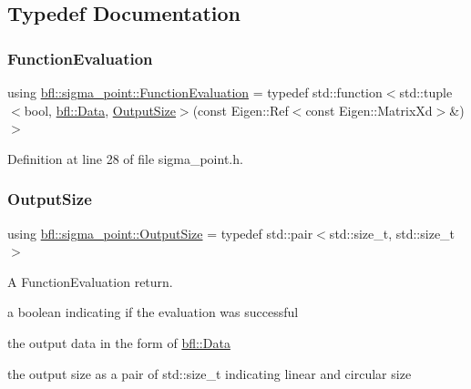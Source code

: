 \subsection{Typedef Documentation}
\mbox{\label{namespacebfl_1_1sigma__point_a6b412638c2556e4c1f84ba10965f785e}} 
\subsubsection{\texorpdfstring{Function\+Evaluation}{FunctionEvaluation}}
{\footnotesize\ttfamily using \mbox{\hyperlink{namespacebfl_1_1sigma__point_a6b412638c2556e4c1f84ba10965f785e}{bfl\+::sigma\+\_\+point\+::\+Function\+Evaluation}} = typedef std\+::function$<$std\+::tuple$<$bool, \mbox{\hyperlink{namespacebfl_af6b103c6821db1b54452f776fdd9dd02}{bfl\+::\+Data}}, \mbox{\hyperlink{namespacebfl_1_1sigma__point_aa482c1c98a2280cd8f7635ba81898b4e}{Output\+Size}}$>$(const Eigen\+::\+Ref$<$const Eigen\+::\+Matrix\+Xd$>$\&)$>$}



Definition at line 28 of file sigma\+\_\+point.\+h.

\mbox{\label{namespacebfl_1_1sigma__point_aa482c1c98a2280cd8f7635ba81898b4e}} 
\subsubsection{\texorpdfstring{Output\+Size}{OutputSize}}
{\footnotesize\ttfamily using \mbox{\hyperlink{namespacebfl_1_1sigma__point_aa482c1c98a2280cd8f7635ba81898b4e}{bfl\+::sigma\+\_\+point\+::\+Output\+Size}} = typedef std\+::pair$<$std\+::size\+\_\+t, std\+::size\+\_\+t$>$}



A Function\+Evaluation return. 


\begin{DoxyItemize}
\item a boolean indicating if the evaluation was successful
\item the output data in the form of \mbox{\hyperlink{namespacebfl_af6b103c6821db1b54452f776fdd9dd02}{bfl\+::\+Data}}
\item the output size as a pair of std\+::size\+\_\+t indicating linear and circular size 
\end{DoxyItemize}

